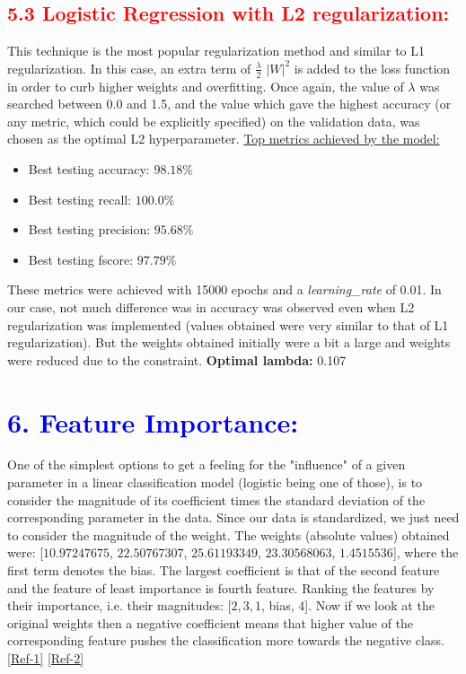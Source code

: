 \documentclass[a4paper,10pt,twocolumn]{article}
\begin{document}
\subsection*{\textcolor{red}{5.3 Logistic Regression with L2 regularization:}}
This technique is the most popular regularization method and similar to L1 regularization. In this case, an extra term of $\frac{\lambda}{2}$ $|W|^2$ is added to the loss function in order to curb higher weights and overfitting. Once again, the value of $\lambda$ was searched between 0.0 and 1.5, and the value which gave the highest accuracy (or any metric, which could be explicitly specified) on the validation data, was chosen as the optimal L2 hyperparameter.
\newline
\newline
\underline{Top metrics achieved by the model:}
\begin{itemize}
\item{Best testing accuracy: $98.18\%$}
\item{Best testing recall: $100.0\%$}
\item{Best testing precision: $95.68\%$}
\item{Best testing fscore: $97.79\%$}
\end{itemize}
These metrics were achieved with 15000 epochs and a \textit{learning\_rate} of 0.01. In our case, not much difference was in accuracy was observed even when L2 regularization was implemented (values obtained were very similar to that of L1 regularization). But the weights obtained initially were a bit a large and weights were reduced due to the constraint.
\textbf{Optimal lambda:} 0.107

\section*{\textcolor{blue}{6. Feature Importance:}}
One of the simplest options to get a feeling for the "influence" of a given parameter in a linear classification model (logistic being one of those), is to consider the magnitude of its coefficient times the standard deviation of the corresponding parameter in the data. Since our data is standardized, we just need to consider the magnitude of the weight. The weights (absolute values) obtained were: [$10.97247675$, $22.50767307$, $25.61193349$, $23.30568063$, $1.4515536$], where the first term denotes the bias. The largest coefficient is that of the second feature and the feature of least importance is fourth feature. Ranking the features by their importance, i.e. their magnitudes: [$2, 3, 1$, bias, $4$]. Now if we look at the original weights then a negative coefficient means that higher value of the corresponding feature pushes the classification more towards the negative class. 
\href{https://stackoverflow.com/questions/51462979/how-to-get-feature-importance-in-logistic-regression-using-weights}{[Ref-1]}
\href{https://stackoverflow.com/questions/34052115/how-to-find-the-importance-of-the-features-for-a-logistic-regression-model}{[Ref-2]}
\end{document}
